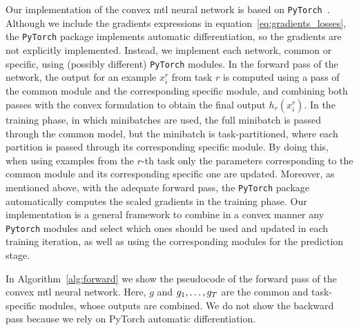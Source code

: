 Our implementation of the convex \acrshort{mtl} neural network is based on \texttt{PyTorch}~\citep{PyTorch}.
Although we include the gradients expressions in equation~\eqref{eq:gradients_losses}, the \texttt{PyTorch} package implements automatic differentiation, so the gradients are not explicitly implemented.
Instead, we implement each network, common or specific, using (possibly different) \texttt{PyTorch} modules.
In the forward pass of the network, the output for an example $x_i^r$ from task $r$ is computed using a pass of the common module and the corresponding specific module, and combining both passes with the convex formulation to obtain the final output $h_r(x_i^r)$.
In the training phase, in which minibatches are used, the full minibatch is passed through the common model, but the minibatch is task-partitioned, where each partition is passed through its corresponding specific module.
By doing this, when using examples from the $r$-th task only the parameters corresponding to the common module and its corresponding specific one are updated.
Moreover, as mentioned above, with the adequate forward pass, the \texttt{PyTorch} package automatically computes the scaled gradients in the training phase.
Our implementation is a general framework to combine in a convex manner any   \texttt{Pytorch} modules and select which ones should be used and updated in each training iteration, as well as using the corresponding modules for the prediction stage.

{In Algorithm~\ref{alg:forward} we show the pseudocode of the forward pass of the convex \acrshort{mtl} neural network. Here, $g$ and $g_1, \ldots, g_T$ are the common and task-specific modules, whose outputs are combined. We do not show the backward pass because we rely on PyTorch automatic differentiation.}



















